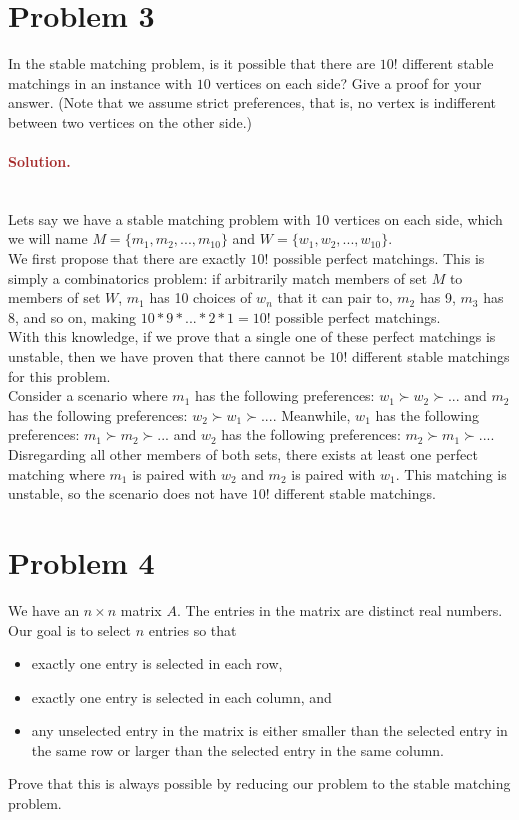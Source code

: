 \section*{Problem 3}
In the stable matching problem, is it possible that there are $10!$ different stable matchings in an instance with $10$ vertices on each side? Give a proof for your answer. (Note that we assume strict preferences, that is, no vertex is indifferent between two vertices on the other side.)

\paragraph{\textcolor{brown}{Solution.}} \: \\
Lets say we have a stable matching problem with 10 vertices on each side, which we will name $M=\{m_1, m_2, ..., m_{10}\}$ and $W=\{w_1, w_2, ..., w_{10}\}$. 
\\We first propose that there are exactly $10!$ possible perfect matchings. This is simply a combinatorics problem: if arbitrarily match members of set $M$ to members of set $W$, $m_1$ has 10 choices of $w_n$ that it can pair to, $m_2$ has 9, $m_3$ has 8, and so on, making $10*9*...*2*1=10!$ possible perfect matchings.
\\With this knowledge, if we prove that a single one of these perfect matchings is unstable, then we have proven that there cannot be $10!$ different stable matchings for this problem.
\\Consider a scenario where $m_1$ has the following preferences: $w_1 \succ w_2 \succ ...$ and $m_2$ has the following preferences: $w_2 \succ w_1 \succ ...$. Meanwhile, $w_1$ has the following preferences: $m_1 \succ m_2 \succ ...$ and $w_2$ has the following preferences: $m_2 \succ m_1 \succ ...$. Disregarding all other members of both sets, there exists at least one perfect matching where $m_1$ is paired with $w_2$ and $m_2$ is paired with $w_1$. This matching is unstable, so the scenario does not have $10!$ different stable matchings.

\section*{Problem 4}
We have an $n \times n$ matrix $A$. The entries in the matrix are distinct real numbers. Our goal is to select $n$ entries so that
\begin{itemize}
    \item exactly one entry is selected in each row,
    \item exactly one entry is selected in each column, and
    \item any unselected entry in the matrix is either smaller than the selected entry in the same row or larger than the selected entry in the same column.
\end{itemize}
Prove that this is always possible by reducing our problem to the stable matching problem.

